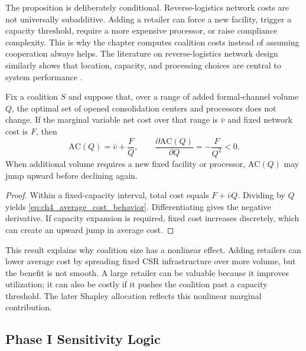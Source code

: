 The proposition is deliberately conditional. Reverse-logistics network costs are not universally subadditive. Adding a retailer can force a new facility, trigger a capacity threshold, require a more expensive processor, or raise compliance complexity. This is why the chapter computes coalition costs instead of assuming cooperation always helps. The literature on reverse-logistics network design similarly shows that location, capacity, and processing choices are central to system performance \cite{tadaros2022location,bafadal2024proposed,wang2025planning,ma2024unlocking,wang2025sustainable}.

\begin{proposition}
\label{prop:ch4_average_cost_behavior}
Fix a coalition $S$ and suppose that, over a range of added formal-channel volume $Q$, the optimal set of opened consolidation centers and processors does not change. If the marginal variable net cost over that range is $\bar v$ and fixed network cost is $F$, then
\begin{equation}
\label{eq:ch4_average_cost_behavior}
\mathrm{AC}(Q)=\bar v+\frac{F}{Q},
\qquad
\frac{\partial \mathrm{AC}(Q)}{\partial Q}=-\frac{F}{Q^2}<0.
\end{equation}
When additional volume requires a new fixed facility or processor, $\mathrm{AC}(Q)$ may jump upward before declining again.
\end{proposition}

\begin{proof}
Within a fixed-capacity interval, total cost equals $F+\bar v Q$. Dividing by $Q$ yields \eqref{eq:ch4_average_cost_behavior}. Differentiating gives the negative derivative. If capacity expansion is required, fixed cost increases discretely, which can create an upward jump in average cost.
\end{proof}

This result explains why coalition size has a nonlinear effect. Adding retailers can lower average cost by spreading fixed CSR infrastructure over more volume, but the benefit is not smooth. A large retailer can be valuable because it improves utilization; it can also be costly if it pushes the coalition past a capacity threshold. The later Shapley allocation reflects this nonlinear marginal contribution.

\subsection{Phase I Sensitivity Logic}

